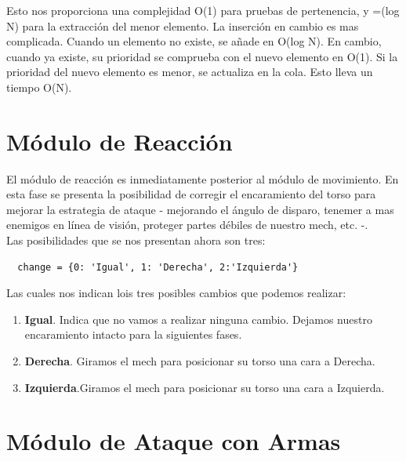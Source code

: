 \documentclass[a4paper,12pt,oneside]{book}
\begin{document}
Esto nos proporciona una complejidad O(1) para pruebas de pertenencia,
y =(log N) para la extracción del menor elemento. La inserción en
cambio es mas complicada. Cuando un elemento no existe, se añade en
O(log N). En cambio, cuando ya existe, su prioridad se comprueba con
el nuevo elemento en O(1). Si la prioridad del nuevo elemento es
menor, se actualiza en la cola. Esto lleva un tiempo O(N).

\section{Módulo de Reacción}

El módulo de reacción es inmediatamente posterior al módulo de
movimiento. En esta fase se presenta la posibilidad de corregir el
encaramiento del torso para mejorar la estrategia de ataque -
mejorando el ángulo de disparo, tenemer a mas enemigos en línea de
visión, proteger partes débiles de nuestro mech, etc. -.\\

Las posibilidades que se nos presentan ahora son tres:
\begin{lstlisting}
  change = {0: 'Igual', 1: 'Derecha', 2:'Izquierda'}
\end{lstlisting}
Las cuales nos indican lois tres posibles cambios que podemos
realizar:
\begin{enumerate}
\item {\bf Igual}. Indica que no vamos a realizar ninguna
  cambio. Dejamos nuestro encaramiento intacto para la siguientes
  fases.
\item {\bf Derecha}. Giramos el mech para posicionar su torso una cara
  a Derecha.
\item {\bf Izquierda}.Giramos el mech para posicionar su torso una cara
  a Izquierda.
\end{enumerate}


\section{Módulo de Ataque con Armas}
\end{document}
